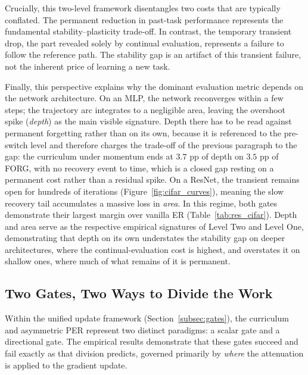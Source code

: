 Crucially, this two-level framework disentangles two costs that are typically conflated. The permanent reduction in past-task performance represents the fundamental stability--plasticity trade-off. In contrast, the temporary transient drop, the part revealed solely by continual evaluation, represents a failure to follow the reference path. The stability gap is an artifact of this transient failure, not the inherent price of learning a new task.

Finally, this perspective explains why the dominant evaluation metric depends on the network architecture. On an MLP, the network reconverges within a few steps; the trajectory arc integrates to a negligible area, leaving the overshoot spike (\emph{depth}) as the main visible signature. Depth there has to be read against permanent forgetting rather than on its own, because it is referenced to the pre-switch level and therefore charges the trade-off of the previous paragraph to the gap: the curriculum under momentum ends at $3.7$ pp of depth on $3.5$ pp of FORG, with no recovery event to time, which is a closed gap resting on a permanent cost rather than a residual spike. On a ResNet, the transient remains open for hundreds of iterations (Figure~\ref{fig:cifar_curves}), meaning the slow recovery tail accumulates a massive loss in \emph{area}. In this regime, both gates demonstrate their largest margin over vanilla ER (Table~\ref{tab:res_cifar}). Depth and area serve as the respective empirical signatures of Level Two and Level One, demonstrating that depth on its own understates the stability gap on deeper architectures, where the continual-evaluation cost is highest, and overstates it on shallow ones, where much of what remains of it is permanent.

\subsection{Two Gates, Two Ways to Divide the Work}
\label{subsec:disc_gates}

Within the unified update framework (Section~\ref{subsec:gates}), the curriculum and asymmetric PER represent two distinct paradigms: a scalar gate and a directional gate. The empirical results demonstrate that these gates succeed and fail exactly as that division predicts, governed primarily by \emph{where} the attenuation is applied to the gradient update.

